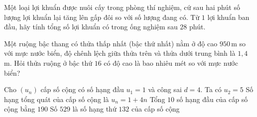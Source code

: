 \begin{ex}%
Một loại lợi khuẩn được nuôi cấy trong phòng thí nghiệm, cứ sau hai phút số lượng lợi khuẩn lại tăng lên gấp đôi so với số lượng đang có. Từ $ 1$ lợi khuẩn ban đầu, hãy tính tổng số lợi khuẩn có trong ống nghiệm sau $ 28$ phút.
\end{ex}

\begin{bt}%
Một ruộng bậc thang có thửa thấp nhất (bậc thứ nhất) nằm ở độ cao $950$\,m so với mực nước biển, độ chênh lệch giữa thửa trên và thửa dưới trung bình là $1{,}4$\,m. Hỏi thửa ruộng ở bậc thứ $16$ có độ cao là bao nhiêu mét so với mực nước biển?
\end{bt}

\begin{ex}%
	Cho $(u_n)$ cấp số cộng  có số hạng đầu $u_1=1$ và công sai   $d=4$.
	\choiceTF
	{\True Ta có $u_2=5$}
	{Số hạng tổng quát của cấp số cộng là $u_n=1+4n$}
	{\True Tổng $10$ số hạng đầu của cấp số cộng bằng $190$}
	{Số $529$ là số hạng thứ $132$ của cấp số cộng}
\end{ex}

